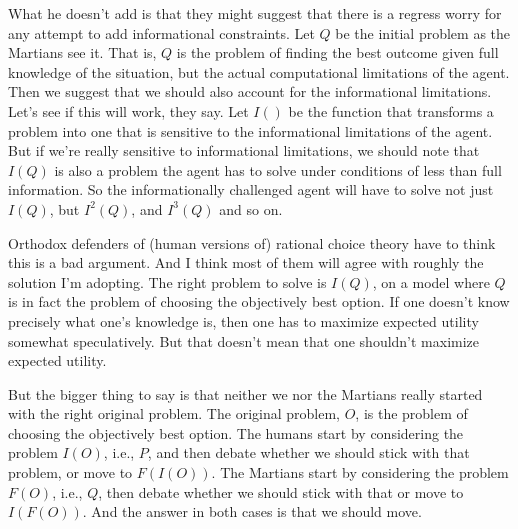 \documentclass[
  11pt,
  letterpaper,
  DIV=11,
  numbers=noendperiod,
  oneside]{scrartcl}
\begin{document}
What he doesn't add is that they might suggest that there is a regress
worry for any attempt to add informational constraints. Let \(Q\) be the
initial problem as the Martians see it. That is, \(Q\) is the problem of
finding the best outcome given full knowledge of the situation, but the
actual computational limitations of the agent. Then we suggest that we
should also account for the informational limitations. Let's see if this
will work, they say. Let \(I()\) be the function that transforms a
problem into one that is sensitive to the informational limitations of
the agent. But if we're really sensitive to informational limitations,
we should note that \(I(Q)\) is also a problem the agent has to solve
under conditions of less than full information. So the
informationally challenged agent will have to solve not just \(I(Q)\),
but \(I^2(Q)\), and \(I^3(Q)\) and so on.

Orthodox defenders of (human versions of) rational choice theory have to
think this is a bad argument. And I think most of them will agree with
roughly the solution I'm adopting. The right problem to solve is
\(I(Q)\), on a model where \(Q\) is in fact the problem of choosing the
objectively best option. If one doesn't know precisely what one's
knowledge is, then one has to maximize expected utility somewhat
speculatively. But that doesn't mean that one shouldn't maximize
expected utility.

But the bigger thing to say is that neither we nor the Martians really
started with the right original problem. The original problem, \(O\), is
the problem of choosing the objectively best option. The humans start by
considering the problem \(I(O)\), i.e., \(P\), and then debate whether
we should stick with that problem, or move to \(F(I(O))\). The Martians
start by considering the problem \(F(O)\), i.e., \(Q\), then debate
whether we should stick with that or move to \(I(F(O))\). And the answer
in both cases is that we should move.
\end{document}
